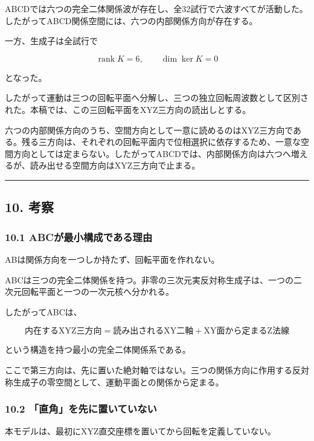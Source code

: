 \documentclass[
  10pt,
  a4paper,
]{article}
\begin{document}
ABCDでは六つの完全二体関係波が存在し、全32試行で六波すべてが活動した。したがってABCD関係空間には、六つの内部関係方向が存在する。

一方、生成子は全試行で

\[
\operatorname{rank}K=6,
\qquad
\dim\ker K=0
\]

となった。

したがって運動は三つの回転平面へ分解し、三つの独立回転周波数として区別された。本稿では、この三回転平面をXYZ三方向の読出しとする。

六つの内部関係方向のうち、空間方向として一意に読めるのはXYZ三方向である。残る三方向は、それぞれの回転平面内で位相選択に依存するため、一意な空間方向としては定まらない。したがってABCDでは、内部関係方向は六つへ増えるが、読み出せる空間方向はXYZ三方向で止まる。

\begin{center}\rule{0.5\linewidth}{0.5pt}\end{center}

\subsection{10. 考察}\label{ux8003ux5bdf}

\subsubsection{10.1
ABCが最小構成である理由}\label{abcux304cux6700ux5c0fux69cbux6210ux3067ux3042ux308bux7406ux7531}

ABは関係方向を一つしか持たず、回転平面を作れない。

ABCは三つの完全二体関係を持つ。非零の三次元実反対称生成子は、一つの二次元回転平面と一つの一次元核へ分かれる。

したがってABCは、

\[
\boxed{
\text{内在するXYZ三方向}
=
\text{読み出されるXY二軸}
+
\text{XY面から定まるZ法線}
}
\]

という構造を持つ最小の完全二体関係系である。

ここで第三方向は、先に置いた絶対軸ではない。三つの関係方向に作用する反対称生成子の零空間として、運動平面との関係から定まる。

\subsubsection{10.2
「直角」を先に置いていない}\label{ux76f4ux89d2ux3092ux5148ux306bux7f6eux3044ux3066ux3044ux306aux3044}

本モデルは、最初にXYZ直交座標を置いてから回転を定義していない。
\end{document}
